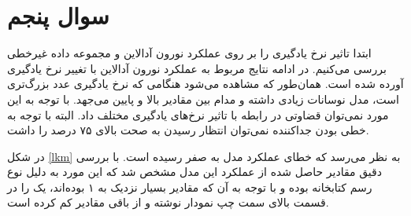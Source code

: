 \documentclass[12pt, a4paper]{article}
\begin{document}
\section*{سوال پنجم}

ابتدا تاثیر نرخ یادگیری را بر روی عملکرد نورون آدالاین و مجموعه داده غیرخطی
بررسی می‌کنیم. در ادامه نتایج مربوط به عملکرد نورون آدالاین با تغییر نرخ یادگیری آورده شده است.
همان‌طور که مشاهده می‌شود هنگامی که نرخ یادگیری عدد بزرگ‌تری است، مدل نوسانات زیادی داشته و مدام
بین مقادیر بالا و پایین می‌جهد. با توجه به این مورد نمی‌توان قضاوتی در رابطه با تاثیر نرخ‌های یادگیری مختلف
داد. البته با توجه به خطی بودن جداکننده نمی‌توان انتظار رسیدن به صحت بالای ۷۵ درصد را داشت.

در شکل \ref{lkm} به نظر می‌رسد که خطای عملکرد مدل به صفر رسیده است. با بررسی دقیق مقادیر
حاصل شده از عملکرد این مدل مشخص شد که این مورد به دلیل نوع رسم کتابخانه 
بوده و با توجه به آن که مقادیر بسیار نزدیک به ۱ بوده‌اند، یک را در قسمت بالای سمت چپ نمودار
نوشته و از باقی مقادیر کم کرده است.
\end{document}
